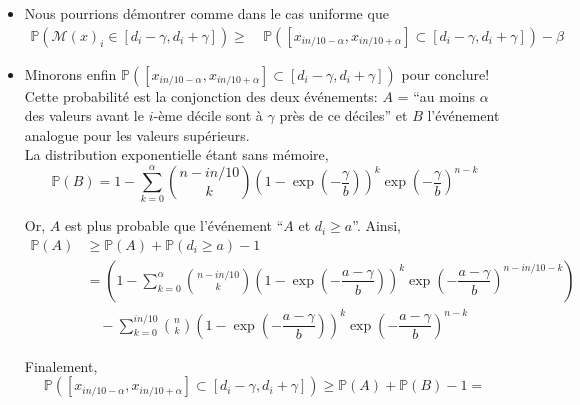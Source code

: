 \begin{itemize}[label=•]
    \item Nous pourrions démontrer comme dans le cas uniforme que
    \begin{align*}
        \mathbb P\left(  \mathcal M(x)_i \in [d_i - \gamma, d_i + \gamma] \right) \geq &\ \mathbb P \left([x_{i n/10 -\alpha},x_{i n/10 +\alpha}] \subset [d_i - \gamma, d_i + \gamma] \right) - \beta
   \end{align*}
   \item Minorons enfin \(\mathbb P \left([x_{i n/10 -\alpha},x_{i n/10 +\alpha}] \subset [d_i - \gamma, d_i + \gamma] \right)\) pour conclure!\\
   
   Cette probabilité est la conjonction des deux événements: \(A\) = ``au moins \(\alpha\) des valeurs avant le \(i\)-ème décile sont à \(\gamma\) près de ce déciles'' et \(B\) l'événement analogue pour les valeurs supérieurs.\\

   La distribution exponentielle étant sans mémoire,
   \[
        \mathbb P (B) = 1 - \sum_{k = 0}^{\alpha} \binom{n - in/10}{k} \left( 1 - \exp\left( -\dfrac{\gamma}{b} \right) \right)^k \exp\left( -\dfrac{\gamma}{b} \right)^{n-k}
   \]

   Or, \(A\) est plus probable que l'événement ``\(A\) et \(d_i \geq a\)''. Ainsi, 
   \begin{align*}
        \mathbb P(A) & \geq \mathbb P (A) + \mathbb P(d_i \geq a) - 1\\
        & = \left( 1 - \sum_{k = 0}^{\alpha} \binom{n - in/10}{k} \left( 1 - \exp\left( -\dfrac{a-\gamma}{b} \right) \right)^k \exp\left( -\dfrac{a-\gamma}{b} \right)^{n - in/10 -k} \right)\\
        & \quad - \sum_{k = 0}^{in/10} \binom{n}{k} \left( 1 - \exp\left( -\dfrac{a-\gamma}{b} \right) \right)^k \exp\left( -\dfrac{a-\gamma}{b} \right)^{n-k}
   \end{align*}

   Finalement, 
   \[
    \mathbb P \left([x_{i n/10 -\alpha},x_{i n/10 +\alpha}] \subset [d_i - \gamma, d_i + \gamma] \right) \geq \mathbb P(A) + \mathbb P (B) - 1 =   
   \]


\end{itemize}


